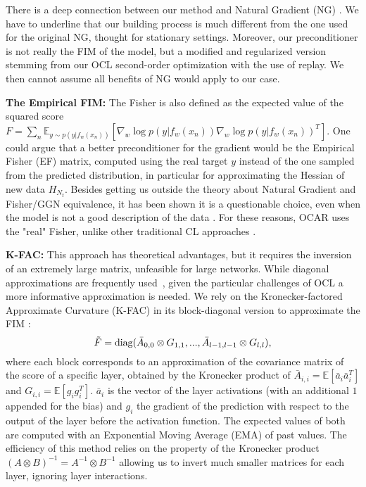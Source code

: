 There is a deep connection between our method and Natural Gradient (NG) \cite{amari1998natural}. We have to underline that our building process is much different from the one used for the original NG, thought for stationary settings. Moreover, our preconditioner is not really the FIM of the model, but a modified and regularized version stemming from our OCL second-order optimization with the use of replay. We then cannot assume all benefits of NG would apply to our case. 

\textbf{The Empirical FIM: } The Fisher is also defined as the expected value of the squared score $F = \sum_n \mathbb{E}_{y \sim p(y|f_w(x_n))}[\nabla_w \log p(y|f_w(x_n)) \nabla_w \log p(y|f_w(x_n))^T ]$. One could argue that a better preconditioner for the gradient would be the Empirical Fisher (EF) matrix, computed using the real target $y$ instead of the one sampled from the predicted distribution, in particular for approximating the Hessian of new data $H_{N_t}$. Besides getting us outside the theory about Natural Gradient and Fisher/GGN equivalence, it has been shown it is a questionable choice, even when the model is not a good description of the data \cite{kunstner2019limitations}. For these reasons, OCAR uses the "real" Fisher, unlike other traditional CL approaches \cite{kirkpatrick2017overcoming}. 

\textbf{K-FAC: }This approach has theoretical advantages, but it requires the inversion of an extremely large matrix, unfeasible for large networks. While diagonal approximations are frequently used~\cite{kirkpatrick2017overcoming,kingma2014adam}, given the particular challenges of OCL a more informative approximation is needed. We rely on the Kronecker-factored Approximate Curvature (K-FAC) in its block-diagonal version to approximate the FIM \cite{martens2015optimizing}:
\begin{equation*}
    \Tilde{F} = \text{diag}(\bar{A}_{0,0} \otimes G_{1,1}, ... ,\bar{A}_{l-1,l-1} \otimes G_{l,l}),
\end{equation*}
where each block corresponds to an approximation of the covariance matrix of the score of a specific layer, obtained by the Kronecker product of $\bar{A}_{i, i} = \mathbb{E}[\bar{a}_i \bar{a}_i^T]$ and $G_{i, i} = \mathbb{E}[g_i g_i^T]$. $\bar{a}_i$ is the vector of the layer activations (with an additional $1$ appended for the bias) and $g_i$ the gradient of the prediction with respect to the output of the layer before the activation function. The expected values of both are computed with an Exponential Moving Average (EMA) of past values. The efficiency of this method relies on the property of the Kronecker product $(A \otimes B)^{-1} = A^{-1} \otimes B^{-1}$ allowing us to invert much smaller matrices for each layer, ignoring layer interactions. 


